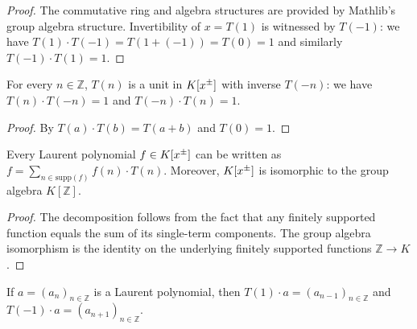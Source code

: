 \begin{proof}
\leanok
The commutative ring and algebra structures are provided by Mathlib's
group algebra structure.
Invertibility of $x = T(1)$ is witnessed by $T(-1)$: we have
$T(1) \cdot T(-1) = T(1 + (-1)) = T(0) = 1$ and similarly
$T(-1) \cdot T(1) = 1$.
\end{proof}

\begin{lemma}
\label{lem.fps.laure.T-inv}
\leanhelper
\leanok
For every $n \in \mathbb{Z}$, $T(n)$ is a unit in $K[x^{\pm}]$ with
inverse $T(-n)$: we have $T(n) \cdot T(-n) = 1$ and $T(-n) \cdot T(n) = 1$.
\end{lemma}

\begin{proof}
\leanok
By $T(a) \cdot T(b) = T(a+b)$ and $T(0) = 1$.
\end{proof}

\begin{lemma}
\label{lem.fps.laure.laupol-decomp}
\leanhelper
\leanok
Every Laurent polynomial $f \in K[x^{\pm}]$ can be written as
$f = \sum_{n \in \mathrm{supp}(f)} f(n) \cdot T(n)$.
Moreover, $K[x^{\pm}]$ is isomorphic to the group algebra
$K[\mathbb{Z}]$.
\end{lemma}

\begin{proof}
\leanok
The decomposition follows from the fact that any finitely supported
function equals the sum of its single-term components.
The group algebra isomorphism is the identity on the
underlying finitely supported functions $\mathbb{Z} \to K$.
\end{proof}

\begin{lemma}
\label{lem.fps.laure.xa}
\leantarget
\leanok
If $a = (a_n)_{n \in \mathbb{Z}}$ is a Laurent polynomial, then
$T(1) \cdot a = (a_{n-1})_{n \in \mathbb{Z}}$ and
$T(-1) \cdot a = (a_{n+1})_{n \in \mathbb{Z}}$.
\end{lemma}

